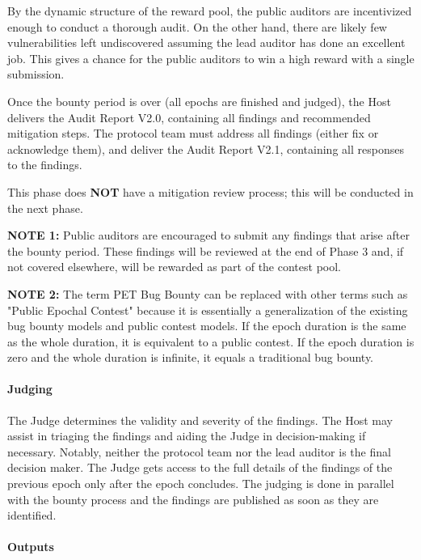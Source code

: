 \documentclass[10pt]{extarticle}
\begin{document}
By the dynamic structure of the reward pool, the public auditors are
incentivized enough to conduct a thorough audit. On the other hand,
there are likely few vulnerabilities left undiscovered assuming the lead
auditor has done an excellent job. This gives a chance for the public
auditors to win a high reward with a single submission.

Once the bounty period is over (all epochs are finished and judged), the
Host delivers the Audit Report V2.0, containing all findings and
recommended mitigation steps. The protocol team must address all
findings (either fix or acknowledge them), and deliver the Audit Report
V2.1, containing all responses to the findings.

This phase does \textbf{NOT} have a mitigation review process; this will
be conducted in the next phase.

\textbf{NOTE 1:} Public auditors are encouraged to submit any findings
that arise after the bounty period. These findings will be reviewed at
the end of Phase 3 and, if not covered elsewhere, will be rewarded as
part of the contest pool.

\textbf{NOTE 2:} The term PET Bug Bounty can be replaced with other
terms such as "Public Epochal Contest" because it is essentially a
generalization of the existing bug bounty models and public contest
models. If the epoch duration is the same as the whole duration, it is
equivalent to a public contest. If the epoch duration is zero and the
whole duration is infinite, it equals a traditional bug bounty.

\paragraph{Judging}\label{judging-1}

The Judge determines the validity and severity of the findings. The Host
may assist in triaging the findings and aiding the Judge in
decision-making if necessary. Notably, neither the protocol team nor the
lead auditor is the final decision maker. The Judge gets access to the
full details of the findings of the previous epoch only after the epoch
concludes. The judging is done in parallel with the bounty process and
the findings are published as soon as they are identified.

\paragraph{Outputs}\label{outputs-1}
\end{document}
